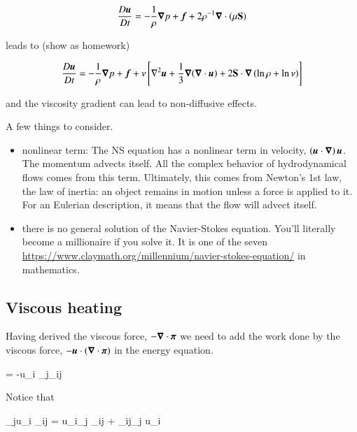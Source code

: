 \begin{equation}
\frac{D {\boldsymbol{u}}}{D t}  = -\frac{1}{\rho}{\boldsymbol{\nabla}}{p} +{\boldsymbol{f}} +2\rho^{-1}{\boldsymbol{\nabla}}\cdot{\left(\mu\boldsymbol{\mathrm{S}} \right)}
 \end{equation}

\noindent  leads to (show as homework)

\begin{equation}
\frac{D {\boldsymbol{u}}}{D t}  = -\frac{1}{\rho}{\boldsymbol{\nabla}}{p} +{\boldsymbol{f}} + \nu
\left[\nabla^2 {\boldsymbol{u}} +\frac{1}{3}{\boldsymbol{\nabla}}{\left({\boldsymbol{\nabla}}\cdot{{\boldsymbol{u}}}\right)} + 2\boldsymbol{\mathrm{S}}\cdot{\boldsymbol{\nabla}}\left(\ln\rho+\ln\nu\right)\right]
 \end{equation}

\noindent and the viscosity gradient can lead to non-diffusive effects. 
 
A few things to consider.

\begin{itemize}
  
\item nonlinear term: The NS equation has a nonlinear term in
  velocity, $\left({\boldsymbol{u}}\cdot{\boldsymbol{\nabla}}\right){\boldsymbol{u}}$. The momentum advects
  itself. All the complex behavior of hydrodynamical flows comes from this term. Ultimately,
  this comes from Newton's 1st law, the law of inertia: an object
  remains in motion unless a force is applied to it. For an Eulerian
  description, it means that the flow will advect itself.

\item there is no general solution of the Navier-Stokes
  equation. You'll literally become a millionaire if you solve it. It
  is one of the seven
  \href{Millennium Prize
    problems}{https://www.claymath.org/millennium/navier-stokes-equation/}
  in mathematics. 

 \end{itemize}

 \subsection{Viscous heating}

 Having derived the viscous force, $-{\boldsymbol{\nabla}}\cdot{\boldsymbol{\mathrm{\pi}}}$ we need to add the work done by the
 viscous force,  $-{\boldsymbol{u}}\cdot\left({\boldsymbol{\nabla}}\cdot{\boldsymbol{\mathrm{\pi}}}\right)$ in the energy equation.

 \beq
{} = -u_i \partial_j\pi_{ij}
 \eeq

 Notice that

 \beq
\partial_ju_i \pi_{ij} = u_i\partial_j \pi_{ij} + \pi_{ij}\partial_j u_i 
 \eeq 

